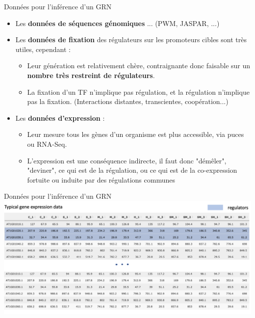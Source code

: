 	\begin{frame}{Données pour l'inférence d'un GRN}
\begin{itemize}
   \item Les \textbf{données de séquences génomiques} ... (PWM, JASPAR, ...)
    \pause
    \item Les \textbf{données de fixation} des régulateurs sur les promoteurs cibles sont très utiles, cependant : 
    
    \begin{itemize}\scriptsize
        \item Leur génération est relativement chère, contraignante donc faisable sur un \textbf{nombre très restreint de régulateurs}. 
        \item La fixation d'un TF n'implique pas régulation, et la régulation n'implique pas la fixation. (Interactions distantes, transcientes, coopération...)
    \end{itemize}
      \pause
    
    \item Les \textbf{données d'expression} :
    
    \begin{itemize}\scriptsize
        \item Leur mesure tous les gènes d'un organisme est plus accessible, via puces ou RNA-Seq.
        \item L'expression est une conséquence indirecte, il faut donc "démêler", "deviner", ce qui est de la régulation, ou ce qui est de la co-expression fortuite ou induite par des régulations communes
        \end{itemize}
\end{itemize}
	\end{frame}
	
	
	

\begin{frame}{Données pour l'inférence d'un GRN}
    \includegraphics[scale = 0.17]{Figures/Intro/expression_data.png}
\end{frame}

